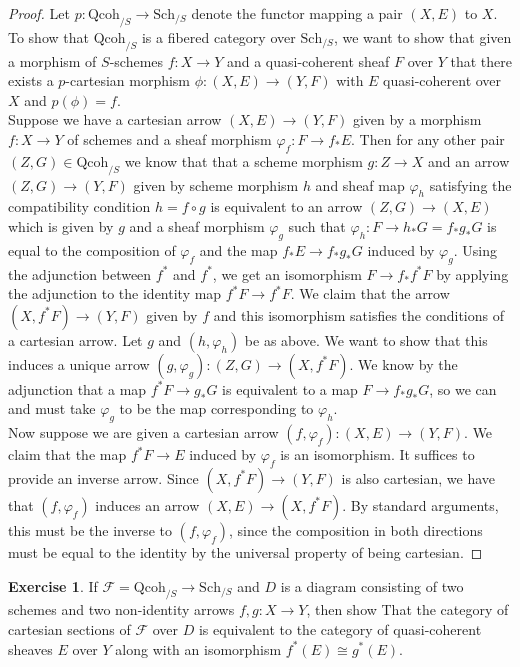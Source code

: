\documentclass[psamsfonts, 12pt]{amsart}
\theoremstyle{definition}
\newtheorem{exer}[thm]{Exercise}
\theoremstyle{remark}
\begin{document}
\begin{proof}
Let $p : \mathrm{Qcoh}_{/S} \to \mathrm{Sch}_{/S}$ denote the functor mapping
a pair $(X,E)$ to $X$. To show that $\mathrm{Qcoh}_{/S}$ is a fibered category
over $\mathrm{Sch}_{/S}$, we want to show that given a morphism of $S$-schemes
$f : X \to Y$ and a quasi-coherent sheaf $F$ over $Y$ that there
exists a $p$-cartesian morphism $\phi : (X,E) \to (Y,F)$ with
$E$ quasi-coherent over $X$ and $p(\phi) = f$. \\

Suppose we have a cartesian arrow $(X,E) \to (Y,F)$ given by a morphism $f : X \to Y$ of
schemes and a sheaf morphism $\varphi_f : F \to f_*E$. Then for any other pair
$(Z,G) \in \mathrm{Qcoh}_{/S}$ we know that that a scheme morphism $g : Z \to X$
and an arrow $(Z,G) \to (Y,F)$ given by scheme morphism $h$ and sheaf map $\varphi_h$
satisfying the compatibility condition $h = f \circ g$ is equivalent to an
arrow $(Z,G) \to (X,E)$ which is given by $g$ and a sheaf morphism $\varphi_g$
such that $\varphi_h : F \to h_*G = f_*g_*G$ is equal to the composition of
$\varphi_f$ and the map $f_*E \to f_*g_*G$ induced by $\varphi_g$. Using
the adjunction between $f^*$ and $f^*$, we get an isomorphism
$F \to f_*f^*F$ by applying the adjunction to the identity map
$f^*F \to f^*F$. We claim that the arrow $(X,f^*F) \to (Y,F)$ given by
$f$ and  this isomorphism satisfies the conditions of a cartesian arrow.
Let $g$ and $(h, \varphi_h)$ be as above. We want to show that
this induces a unique arrow $(g,\varphi_g) : (Z,G) \to (X,f^*F)$. We know by
the adjunction that a map $f^*F \to g_*G$ is equivalent to a map
$F \to f_*g_*G$, so we can and must take $\varphi_g$ to be the map corresponding
to $\varphi_h$. \\

Now suppose we are given a cartesian arrow $(f,\varphi_f) : (X,E) \to (Y,F)$.
We claim that the map $f^*F \to E$ induced by $\varphi_f$ is an isomorphism.
It suffices to provide an inverse arrow. Since $(X,f^*F) \to (Y,F)$ is also
cartesian, we have that $(f,\varphi_f)$ induces an arrow
$(X,E) \to (X, f^*F)$. By standard arguments, this must be the
inverse to $(f,\varphi_f)$, since the composition in both directions must
be equal to the identity by the universal property of being cartesian.
\end{proof}
%
\setcounter{section}{3}
%
\setcounter{thm}{0}
%
\begin{exer}
If $\mathcal{F} = \mathrm{Qcoh}_{/S} \to \mathrm{Sch}_{/S}$ and $D$ is a diagram
consisting of two schemes and two non-identity arrows $f,g : X \to Y$, then show That
the category of cartesian sections of $\mathcal{F}$ over $D$ is equivalent to the
category of quasi-coherent sheaves $E$ over $Y$ along with an isomorphism
$f^*(E) \cong g^*(E)$.
\end{exer}
\end{document}
